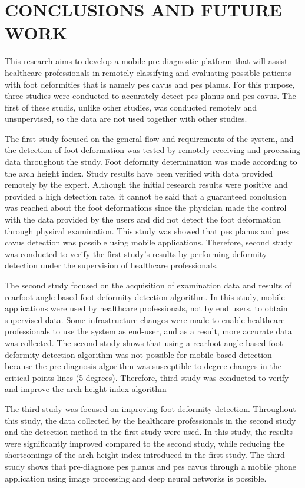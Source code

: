 \chapter{CONCLUSIONS AND FUTURE WORK}\label{chp:ConclusionsAndFutureWork}

This research aims to develop a mobile pre-diagnostic platform that will assist healthcare professionals in remotely classifying and evaluating possible patients with foot deformities that is namely pes cavus and pes planus. For this purpose, three studies were conducted to accurately detect pes planus and pes cavus. The first of these studis, unlike other studies, was conducted remotely and unsupervised, so the data are not used together with other studies.

The first study focused on the general flow and requirements of the system, and the detection of foot deformation was tested by remotely receiving and processing data throughout the study. Foot deformity determination was made according to the arch height index. Study results have been verified with data provided remotely by the expert. Although the initial research results were positive and provided a high detection rate, it cannot be said that a guaranteed conclusion was reached about the foot deformations since the physician made the control with the data provided by the users and did not detect the foot deformation through physical examination. This study was showed that pes planus and pes cavus detection was possible using mobile applications. Therefore, second study was conducted to verify the first study’s results by performing deformity detection under the supervision of healthcare professionals.

The second study focused on the acquisition of examination data and results of rearfoot angle based foot deformity detection algorithm. In this study, mobile applications were used by healthcare professionals, not by end users, to obtain supervised data. Some infrastructure changes were made to enable healthcare professionals to use the system as end-user, and as a result, more accurate data was collected. The second study shows that using a rearfoot angle based foot deformity detection algorithm was not possible for mobile based detection because the pre-diagnosis algorithm was susceptible to degree changes in the critical points lines (5 degrees). Therefore, third study was conducted to verify and improve the  arch height index algorithm

The third study was focused on improving foot deformity detection. Throughout this study, the data collected by the healthcare professionals in the second study and the detection method in the first study were used. In this study, the results were significantly improved compared to the second study, while reducing the shortcomings of the arch height index introduced in the first study. The third study shows that pre-diagnose pes planus and pes cavus through a mobile phone application using image processing and deep neural networks is possible.

